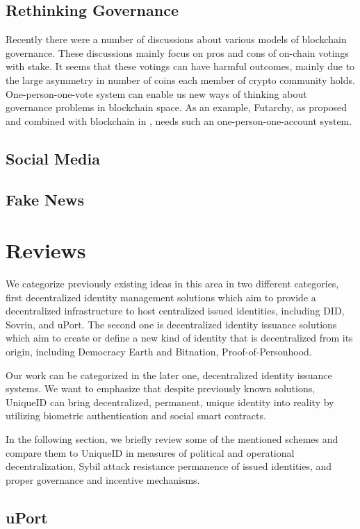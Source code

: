 \documentclass[conference]{IEEEtran}
\begin{document}
\subsection{Rethinking Governance}
Recently there were a number of discussions about various models of blockchain governance. These discussions mainly focus on pros and cons of on-chain votings with stake. It seems that these votings can have harmful outcomes, mainly due to the large asymmetry in number of coins each member of crypto community holds. One-person-one-vote system can enable us new ways of thinking about governance problems in blockchain space. As an example, Futarchy, as proposed and combined with blockchain in \cite{Futarchy}, needs such an one-person-one-account system. 

\subsection{Social Media}
\subsection{Fake News}

\section{Reviews}
We categorize previously existing ideas in this area in two different categories, first decentralized identity management solutions which aim to provide a decentralized infrastructure to host centralized issued identities, including DID, Sovrin, and uPort. The second one is decentralized identity issuance solutions which aim to create or define a new kind of identity that is decentralized from its origin, including Democracy Earth and Bitnation, Proof-of-Personhood.


Our work can be categorized in the later one, decentralized identity issuance systems. We want to emphasize that despite previously known solutions, UniqueID can bring decentralized, permanent, unique identity into reality by utilizing biometric authentication and social smart contracts. 


In the following section, we briefly review some of the mentioned schemes and compare them to UniqueID in measures of political and operational decentralization, Sybil attack resistance  permanence of issued identities, and proper governance and incentive mechanisms. 

\subsection{uPort}
\end{document}
